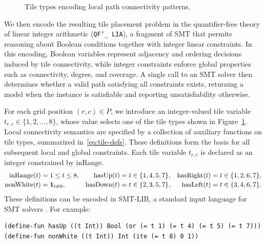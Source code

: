 \documentclass[letterpaper,11pt]{article}
\newcommand{\QFLIA}{\texttt{QF\char`_ LIA}}
\begin{document}
\begin{figure}[h!tbp]
  \centering
  
  \caption{Tile types encoding local path connectivity patterns.}
  \label{fig:tiles}
\end{figure}

We then encode the resulting tile placement problem in the
quantifier-free theory of linear integer arithmetic (\QFLIA), a
fragment of SMT that permits reasoning about Boolean conditions
together with integer linear constraints. In this encoding, Boolean
variables represent adjacency and ordering decisions induced by tile
connectivity, while integer constraints enforce global properties such
as connectivity, degree, and coverage. A single call to an SMT solver
then determines whether a valid path satisfying all constraints
exists, returning a model when the instance is satisfiable and
reporting unsatisfiability otherwise.

For each grid position \((r,c) \in P\), we introduce an integer-valued
tile variable \(t_{r,c} \in \{1,2,\dots,8\}\), whose value selects one
of the tile types shown in Figure~\ref{fig:tiles}. Local connectivity
semantics are specified by a collection of auxiliary functions on tile
types, summarized in~\eqref{eq:tile-defs}. These definitions form the
basis for all subsequent local and global constraints. Each tile
variable \(t_{r,c}\) is declared as an integer constrained by
\(\mathrm{inRange}\).
\begin{equation}
\label{eq:tile-defs}
\setlength{\jot}{2pt}
\begin{aligned}
\mathrm{inRange}(t)
&= 1 \le t \le 8,
&
\mathrm{hasUp}(t)
&= t \in \{1,4,5,7\},
&
\mathrm{hasRight}(t)
&= t \in \{1,2,6,7\},
\\
\mathrm{nonWhite}(t)
&= \mathbf{1}_{t \neq 8},
&
\mathrm{hasDown}(t)
&= t \in \{2,3,5,7\},
&
\mathrm{hasLeft}(t)
&= t \in \{3,4,6,7\}.
\end{aligned}
\end{equation}
These definitions can be encoded in SMT-LIB, a standard input language
for SMT solvers \cite{SMTLIBStandard}. For example:
\begin{tcolorbox}[smtsimple]
\begin{verbatim}
(define-fun hasUp ((t Int)) Bool (or (= t 1) (= t 4) (= t 5) (= t 7)))
(define-fun nonWhite ((t Int)) Int (ite (= t 8) 0 1))
\end{verbatim}
\end{tcolorbox}
\end{document}
